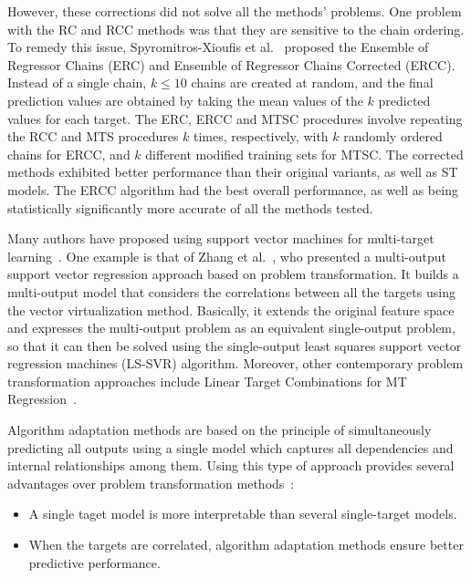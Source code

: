 \documentclass[reqno]{vcuthesis}
\newcommand{\iitem}{\item[-]}
\numberwithin{equation}{chapter}
\begin{document}
However, these corrections did not solve all the methods' problems. One problem with the RC and RCC methods was that they are sensitive to the chain ordering. To remedy this issue, Spyromitros-Xioufis et al.~\cite{Spyromitros2014} proposed the Ensemble of Regressor Chains (ERC) and Ensemble of Regressor Chains Corrected (ERCC). Instead of a single chain, $k \leq 10$ chains are created at random, and the final prediction values are obtained by taking the mean values of the $k$ predicted values for each target. The ERC, ERCC and MTSC procedures involve repeating the RCC and MTS procedures $k$ times, respectively, with $k$ randomly ordered chains for ERCC, and $k$ different modified training sets for MTSC. The corrected methods exhibited better performance than their original variants, as well as ST models. The ERCC algorithm had the best overall performance, as well as being statistically significantly more accurate of all the methods tested\cite{Spyromitros2014}.

Many authors have proposed using support vector machines for multi-target learning~\cite{Borchani2015,Xiong2014,Xu2013}. One example is that of Zhang et al.~\cite{Zhang2012}, who presented a multi-output support vector regression approach based on problem transformation. It builds a multi-output model that considers the correlations between all the targets using the vector virtualization method. Basically, it extends the original feature space and expresses the multi-output problem as an equivalent single-output problem, so that it can then be solved using the single-output least squares support vector regression machines (LS-SVR) algorithm. Moreover, other contemporary problem transformation approaches include Linear Target Combinations for MT Regression~\cite{Tsoumakas2014}.

Algorithm adaptation methods are based on the principle of simultaneously predicting all outputs using a single model which captures all dependencies and internal relationships among them. Using this type of approach provides several advantages over problem transformation methods~\cite{breiman1997predicting,kocev2009using,simila2007input}:
\begin{itemize}
\iitem A single taget model is more interpretable than several single-target models.
\iitem When the targets are correlated, algorithm adaptation methods ensure better predictive performance.
\end{itemize}
\end{document}
